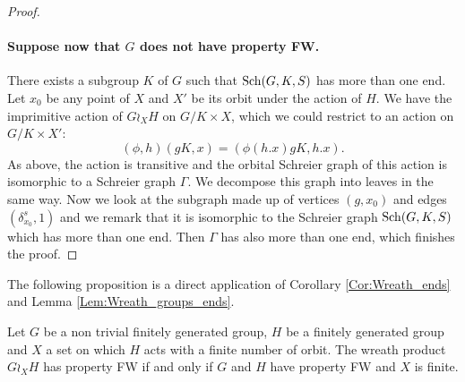 \begin{lem}
\begin{proof}
\paragraph{Suppose now that $G$ does not have property FW.} There exists a subgroup $K$ of $G$ such that $\operatorname{Sch}(G,K,S)$ has more than one end.
Let $x_0$ be any point of $X$ and $X'$ be its orbit under the action of $H$.
We have the imprimitive action of $G\wr_XH$ on $G/K\times X$, which we could restrict to an action on $G/K\times X'$:
\begin{equation*}
(\phi,h)(gK,x) = (\phi(h.x) gK, h.x).
\end{equation*}
As above, the action is transitive and the orbital Schreier graph of this action is isomorphic to a Schreier graph $\Gamma$. We decompose this graph into leaves in the same way. Now we look at the subgraph made up of vertices $(g,x_0)$ and edges $(\delta_{x_0}^s,1)$ and we remark that it is isomorphic to the Schreier graph $\operatorname{Sch}(G,K,S)$ which has more than one end. Then $\Gamma$ has also more than one end, which finishes the proof.
\end{proof}
\end{lem}
%
%
The following proposition is a direct application of Corollary \ref{Cor:Wreath_ends} and Lemma \ref{Lem:Wreath_groups_ends}.
%
%
\begin{prop}
Let $G$ be a non trivial finitely generated group, $H$ be a finitely generated group and $X$ a set on which $H$ acts with a finite number of orbit. The wreath product $G \wr_X H$ has property FW if and only if $G$ and $H$ have property FW and $X$ is finite.
\end{prop}
%
%